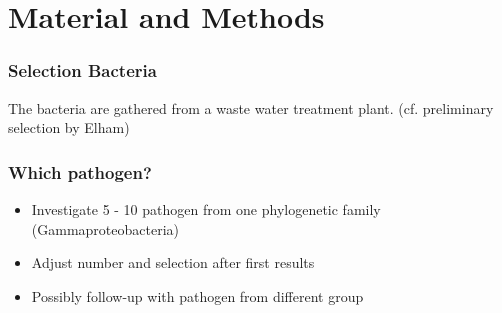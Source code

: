 \documentclass{beamer}
\begin{document}
\section{Material and Methods}

\begin{frame}
\frametitle{Selection Bacteria}

\begin{table}


\end{table}
\small{The bacteria are gathered from a waste water treatment plant. (cf. preliminary selection by Elham)}
\end{frame}

\begin{frame}
\frametitle{Which pathogen?}
\begin{itemize}
\item Investigate 5 - 10 pathogen from one phylogenetic family (Gammaproteobacteria)
\item Adjust number and selection after first results
\item Possibly follow-up with pathogen from different group
\end{itemize}

\end{frame}
\end{document}
